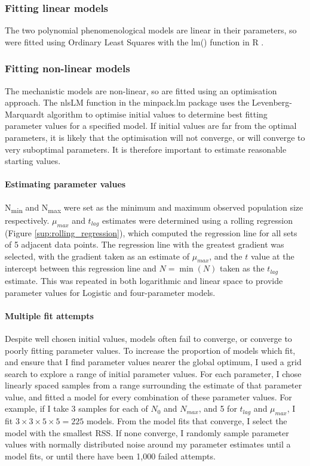 \documentclass[11pt, a4paper]{article}
\begin{document}
\begin{linenumbers}
\subsubsection{Fitting linear models}

The two polynomial phenomenological models are linear in their parameters, so were fitted using Ordinary Least Squares with the lm() function in R \cite{R}.

\subsubsection{Fitting non-linear models}

The mechanistic models are non-linear, so are fitted using an optimisation approach. The nlsLM function in the minpack.lm \cite{minpack} package uses the Levenberg-Marquardt algorithm to optimise initial values to determine best fitting parameter values for a specified model. If initial values are far from the optimal parameters, it is likely that the optimisation will not converge, or will converge to very suboptimal parameters. It is therefore important to estimate reasonable starting values.

\paragraph{Estimating parameter values}
N\textsubscript{min} and N\textsubscript{max} were set as the minimum and maximum observed population size respectively. $\mu_{max}$ and $t_{lag}$ estimates were determined using a rolling regression (Figure \ref{sup:rolling_regression}), which computed the regression line for all sets of 5 adjacent data points. The regression line with the greatest gradient was selected, with the gradient taken as an estimate of $\mu_{max}$, and the $t$ value at the intercept between this regression line and $N = \min(N)$ taken as the $t_{lag}$ estimate. This was repeated in both logarithmic and linear space to provide parameter values for Logistic and four-parameter models.


\paragraph{Multiple fit attempts}
Despite well chosen initial values, models often fail to converge, or converge to poorly fitting parameter values. To increase the proportion of models which fit, and ensure that I find parameter values nearer the global optimum, I used a grid search to explore a range of initial parameter values. For each parameter, I chose linearly spaced samples from a range surrounding the estimate of that parameter value, and fitted a model for every combination of these parameter values. For example, if I take 3 samples for each of $N_0$ and $N_{max}$, and 5 for $t_{lag}$ and $\mu_{max}$, I fit $3 \times 3 \times 5 \times 5 = 225$ models. From the model fits that converge, I select the model with the smallest RSS. If none converge, I randomly sample parameter values with normally distributed noise around my parameter estimates until a model fits, or until there have been 1,000 failed attempts. 


\end{linenumbers}
\end{document}
